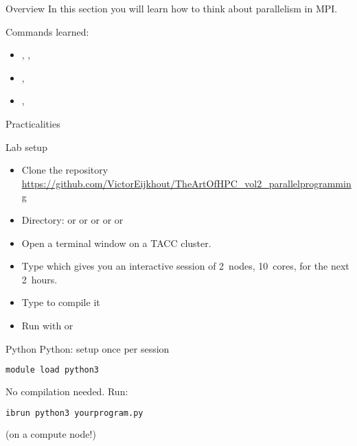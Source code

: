 
\begin{numberedframe}{Overview}
  In this section you will learn how to think about parallelism in
  MPI.

  Commands learned:
  \begin{itemize}
  \item
    , ,
  \item 
    , 
  \item 
    , 
  \end{itemize}
\end{numberedframe}

 {Practicalities}

\begin{tacc}
\begin{numberedframe}{Lab setup}
  \begin{itemize}
  \item Clone the repository\\
    \url{https://github.com/VictorEijkhout/TheArtOfHPC_vol2_parallelprogramming}
  \item Directory:  or  or  or 
    or  or 
  \item Open a terminal window on a TACC cluster.
  \item Type  which gives
    you an interactive session of 2~nodes, 10~cores, for the next
    2~hours.
  \item Type  to compile it
  \item Run with  or  
  \end{itemize}
\end{numberedframe}
\end{tacc}

\begin{python}
  \addtocounter{slidecount}{-1}
\begin{numberedframe}{Python}
 Python: setup once per session
\begin{lstlisting}[language=bash]
module load python3
\end{lstlisting}
No compilation needed. Run:
\begin{lstlisting}[language=bash]
ibrun python3 yourprogram.py
\end{lstlisting}
(on a compute node!)
\end{numberedframe}
\end{python}

